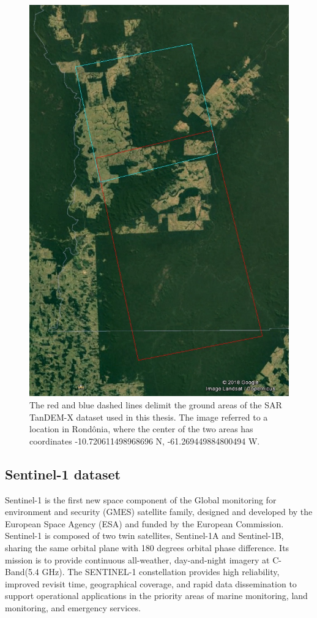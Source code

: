 \begin{figure}[H]
    \centering
    \includegraphics[width=0.6\linewidth]{Cap2-Methods/tandem_dataset.jpg}
    \caption{The red and blue dashed lines delimit the ground areas of the SAR TanDEM-X dataset used in this thesis. The image referred to a location in Rondônia, where the center of the two areas has coordinates -10.720611498968696 N, -61.269449884800494 W.}
    \label{fig:tandem_dataset}
\end{figure}{}

\subsection{Sentinel-1 dataset}

Sentinel-1 is the first new space component of the Global monitoring for environment and security (GMES) satellite family, designed and developed by the European Space Agency (ESA) and funded by the European Commission. Sentinel-1 is composed of two twin satellites, Sentinel-1A and Sentinel-1B, sharing the same orbital plane with 180 degrees orbital phase difference. Its mission is to provide continuous all-weather, day-and-night imagery at C-Band(5.4 GHz). The SENTINEL-1 constellation provides high reliability, improved revisit time, geographical coverage, and rapid data dissemination to support operational applications in the priority areas of marine monitoring, land monitoring, and emergency services.

